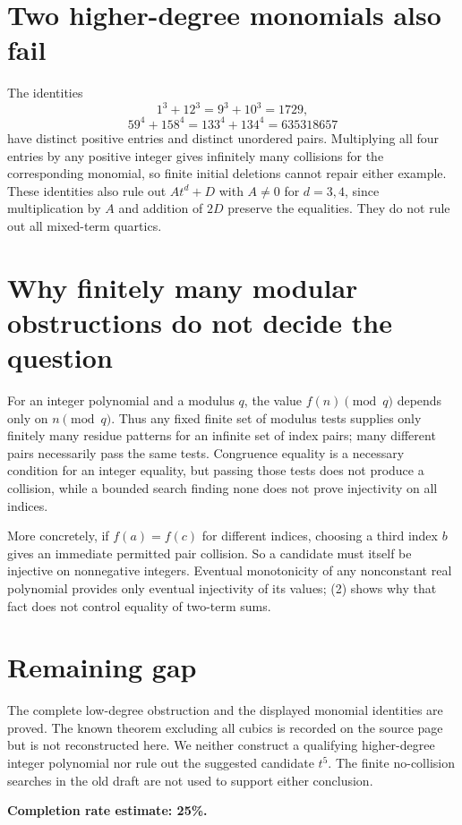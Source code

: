 \documentclass[11pt]{article}
\begin{document}
\section*{Two higher-degree monomials also fail}
The identities
\[
 1^3+12^3=9^3+10^3=1729,
\]
\[
 59^4+158^4=133^4+134^4=635318657
\]
have distinct positive entries and distinct unordered pairs. Multiplying all four entries by any positive integer gives infinitely many collisions for the corresponding monomial, so finite initial deletions cannot repair either example. These identities also rule out $At^d+D$ with $A\ne0$ for $d=3,4$, since multiplication by $A$ and addition of $2D$ preserve the equalities. They do not rule out all mixed-term quartics.

\section*{Why finitely many modular obstructions do not decide the question}
For an integer polynomial and a modulus $q$, the value $f(n)\pmod q$ depends only on $n\pmod q$. Thus any fixed finite set of modulus tests supplies only finitely many residue patterns for an infinite set of index pairs; many different pairs necessarily pass the same tests. Congruence equality is a necessary condition for an integer equality, but passing those tests does not produce a collision, while a bounded search finding none does not prove injectivity on all indices.

More concretely, if $f(a)=f(c)$ for different indices, choosing a third index $b$ gives an immediate permitted pair collision. So a candidate must itself be injective on nonnegative integers. Eventual monotonicity of any nonconstant real polynomial provides only eventual injectivity of its values; (2) shows why that fact does not control equality of two-term sums.

\section*{Remaining gap}
The complete low-degree obstruction and the displayed monomial identities are proved. The known theorem excluding all cubics is recorded on the source page but is not reconstructed here. We neither construct a qualifying higher-degree integer polynomial nor rule out the suggested candidate $t^5$. The finite no-collision searches in the old draft are not used to support either conclusion.

\textbf{Completion rate estimate: 25\%.}
\end{document}
